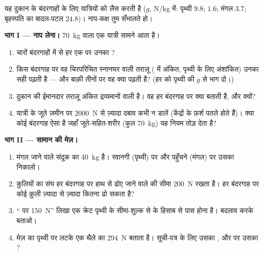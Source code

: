 \begin{problem}\label{pb:g9:weight-vs-mass:1}
यह दुकान  के बंदरगाहों के लिए यात्रियों को लैस करती है
($g$, \unit{N/kg} में: पृथ्वी $9.8$;  $1.6$; मंगल $3.7$;
बृहस्पति का बादल-पटल $24.8$)। नाप-कक्ष तुम सँभालते हो।

\medskip\noindent\textbf{भाग I --- नाप लेना।}
\qty{70}{kg}  वाला एक यात्री सामने आता है।
\begin{enumerate}
  \item चारों बंदरगाहों में से हर एक पर उनका ?
  \item किस बंदरगाह पर वह चिरपरिचित स्नानघर वाली तराज़ू ( में
        अंकित, पृथ्वी के लिए अंशांकित) उनका  सही पढ़ती है ---
        और बाक़ी तीनों पर वह क्या पढ़ती है? (हर  को पृथ्वी की $g$
        से भाग दो।)
  \item दुकान की ईमानदार तराज़ू अंकित द्रव्यमानों वाली  है। वह हर
        बंदरगाह पर क्या बताती है, और क्यों?
  \item यात्री के जूते ज़मीन पर \qty{2000}{N} से ज़्यादा दबाव कभी न
        डालें (केंद्रों के फ़र्श पतले होते हैं)। क्या कोई बंदरगाह ऐसा
        है जहाँ जूते-सहित-शरीर (कुल \qty{70}{kg}) यह नियम तोड़ देता
        है?
\end{enumerate}

\medskip\noindent\textbf{भाग II --- सामान की मेज़।}
\begin{enumerate}[resume]
  \item मंगल जाने वाले संदूक का  \qty{40}{kg} है। रवानगी
        (पृथ्वी) पर और पहुँचने (मंगल) पर उसका  निकालो।
  \item क़ुलियों का संघ हर बंदरगाह पर हाथ से ढोए जाने वाले \emph{}
        की सीमा \qty{200}{N} रखता है। हर बंदरगाह पर कोई क़ुली
        ज़्यादा से ज़्यादा कितना \emph{} ढो सकता है?
  \item `` पर \qty{150}{N}'' लिखा एक क्रेट पृथ्वी के सीमा-शुल्क
        से  के हिसाब से पास होना है। बदलाव करके बताओ।
  \item मेज़ का  पृथ्वी पर लटके एक थैले का  \qty{294}{N}
        बताता है। सूची-पत्र के लिए उसका , और  पर उसका
        ?
\end{enumerate}


\end{problem}
